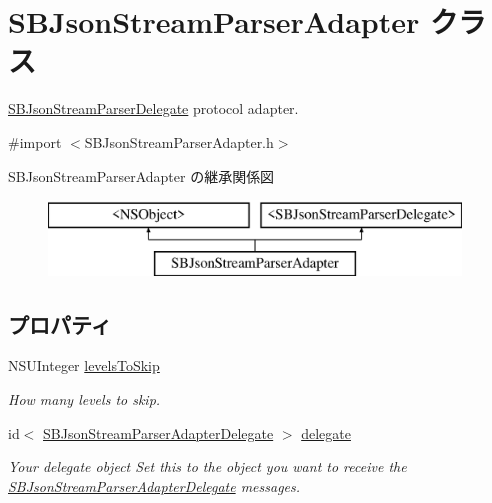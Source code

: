 \hypertarget{interface_s_b_json_stream_parser_adapter}{}\section{S\+B\+Json\+Stream\+Parser\+Adapter クラス}
\label{interface_s_b_json_stream_parser_adapter}


\hyperlink{protocol_s_b_json_stream_parser_delegate-p}{S\+B\+Json\+Stream\+Parser\+Delegate} protocol adapter.  




{\ttfamily \#import $<$S\+B\+Json\+Stream\+Parser\+Adapter.\+h$>$}

S\+B\+Json\+Stream\+Parser\+Adapter の継承関係図\begin{figure}[H]
\begin{center}
\leavevmode
\includegraphics[height=2.000000cm]{interface_s_b_json_stream_parser_adapter}
\end{center}
\end{figure}
\subsection*{プロパティ}
\begin{DoxyCompactItemize}
\item 
N\+S\+U\+Integer \hyperlink{interface_s_b_json_stream_parser_adapter_a1b7451c67d9149b14632c228909659bb}{levels\+To\+Skip}
\begin{DoxyCompactList}\small\item\em How many levels to skip. \end{DoxyCompactList}\item 
\hypertarget{interface_s_b_json_stream_parser_adapter_a9d336f9c9e1caf3291f80918cb13188e}{}id$<$ \hyperlink{protocol_s_b_json_stream_parser_adapter_delegate-p}{S\+B\+Json\+Stream\+Parser\+Adapter\+Delegate} $>$ \hyperlink{interface_s_b_json_stream_parser_adapter_a9d336f9c9e1caf3291f80918cb13188e}{delegate}\label{interface_s_b_json_stream_parser_adapter_a9d336f9c9e1caf3291f80918cb13188e}

\begin{DoxyCompactList}\small\item\em Your delegate object Set this to the object you want to receive the \hyperlink{protocol_s_b_json_stream_parser_adapter_delegate-p}{S\+B\+Json\+Stream\+Parser\+Adapter\+Delegate} messages. \end{DoxyCompactList}\end{DoxyCompactItemize}
